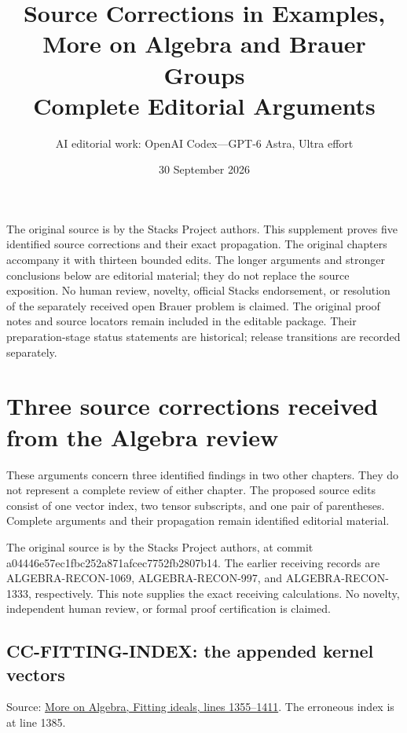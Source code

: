 \documentclass[11pt]{article}
\title{Source Corrections in Examples, More on Algebra and Brauer Groups\\Complete Editorial Arguments}
\author{AI editorial work: OpenAI Codex---GPT-6 Astra, Ultra effort}
\date{30 September 2026}
\begin{document}
\maketitle
\noindent
The original source is by the Stacks Project authors. This supplement
proves five identified source corrections and their exact propagation.
The original chapters accompany it with thirteen bounded edits. The
longer arguments and stronger conclusions below are editorial material;
they do not replace the source exposition. No human review, novelty,
official Stacks endorsement, or resolution of the separately received
open Brauer problem is claimed. The original proof notes and source
locators remain included in the editable package. Their preparation-stage
status statements are historical; release transitions are recorded separately.
\setcounter{secnumdepth}{1}
\tableofcontents
\section{Three source corrections received from the Algebra review}\label{three-source-corrections-received-from-the-algebra-review}

These arguments concern three identified findings in two other chapters. They do not represent a complete review of either chapter. The proposed source edits consist of one vector index, two tensor subscripts, and one pair of parentheses. Complete arguments and their propagation remain identified editorial material.

The original source is by the Stacks Project authors, at commit a04446e5\allowbreak{}7ec1fbc2\allowbreak{}52a871af\allowbreak{}cec7752f\allowbreak{}b2807b14. The earlier receiving records are ALGEBRA-RECON-1069, ALGEBRA-RECON-997, and ALGEBRA-RECON-1333, respectively. This note supplies the exact receiving calculations. No novelty, independent human review, or formal proof certification is claimed.

\subsection{CC-FITTING-INDEX: the appended kernel vectors}\label{cc-fitting-index-the-appended-kernel-vectors}

Source: \href{https://github.com/stacks/stacks-project/blob/a04446e5\allowbreak{}7ec1fbc2\allowbreak{}52a871af\allowbreak{}cec7752f\allowbreak{}b2807b14/more-algebra.tex\#L1355}{More on Algebra, Fitting ideals, lines 1355--1411}. The erroneous index is at line 1385.
\end{document}
